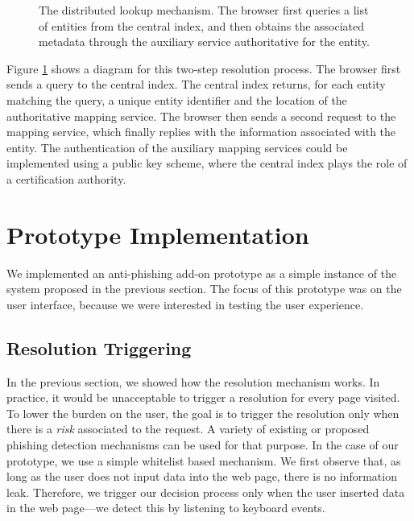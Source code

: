 \documentclass[11pt,styles/chicago]{article}
\begin{document}
\begin{figure}[t]
  \caption{The distributed lookup mechanism. The browser first queries a list of entities from the central index, and then obtains the associated metadata through the auxiliary service authoritative for the entity.}
  \label{fig:distriblkp}
\end{figure}

Figure \ref{fig:distriblkp} shows a diagram for this two-step resolution process. The browser first sends a query to the central index. The central index returns, for each entity matching the query, a unique entity identifier and the location of the authoritative mapping service. The browser then sends a second request to the mapping service, which finally replies with the information associated with the entity. The authentication of the auxiliary mapping services could be implemented using a public key scheme, where the central index plays the role of a certification authority.

\section{Prototype Implementation} %

We implemented an anti-phishing add-on prototype as a simple instance of the system proposed in the previous section. The focus of this prototype was on the user interface, because we were interested in testing the user experience.

\subsection{Resolution Triggering}

In the previous section, we showed how the resolution mechanism works. In practice, it would be unacceptable to trigger a resolution for every page visited. To lower the burden on the user, the goal is to trigger the resolution only when there is a \emph{risk} associated to the request. A variety of existing or proposed phishing detection mechanisms can be used for that purpose. In the case of our prototype, we use a simple whitelist based mechanism. We first observe that, as long as the user does not input data into the web page, there is no information leak. Therefore, we trigger our decision process only when the user inserted data in the web page---we detect this by listening to keyboard events.
\end{document}

